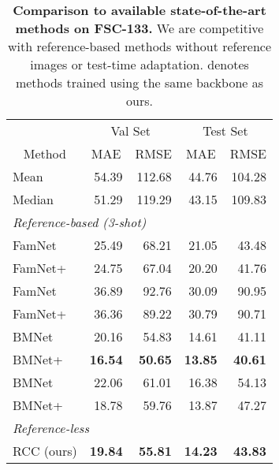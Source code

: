 \documentclass[letterpaper, 11pt]{IEEEtran}
\begin{document}
\begin{table}
    \centering
    \fontsize{9}{9}\selectfont
    \begin{tabular}{lrrrr}
 \toprule

 & \multicolumn{2}{c}{Val Set} & \multicolumn{2}{c}{Test Set} \\
\multicolumn{1}{c}{Method} & \multicolumn{1}{c}{MAE} & \multicolumn{1}{c}{RMSE} & \multicolumn{1}{c}{MAE} & \multicolumn{1}{c}{RMSE} \\
\midrule
Mean & 54.39 & 112.68 & 44.76 & 104.28 \\
Median & 51.29 & 119.29 & 43.15 & 109.83 \\
    \midrule

\multicolumn{3}{l}{\textit{Reference-based (3-shot)}} \\
FamNet 
 \cite{ranjan2021Famnet}
& 25.49 & 68.21 & 21.05 & 43.48 \\
FamNet+ 
 \cite{ranjan2021Famnet}
& 24.75 & 67.04
 &  20.20 & 41.76  \\ 
FamNet 
 \cite{ranjan2021Famnet}  &  
 36.89 & 92.76 & 30.09 & 90.95 \\ 
FamNet+ 
 \cite{ranjan2021Famnet}
 & 36.36 & 89.22 &  30.79 & 90.71\\ 
BMNet 
 \cite{shi2022represent} & 20.16 & 54.83  & 14.61  & 41.11 \\
BMNet+ 
 \cite{shi2022represent}
&\textbf{16.54} &  \textbf{50.65}  & \textbf{13.85}  & \textbf{40.61}  \\
BMNet 
 \cite{shi2022represent}
& 22.06 & 61.01 & 16.38 & 54.13\\ 
BMNet+  
 \cite{shi2022represent}
& 18.78 & 59.76  & 13.87  & 47.27  \\
\midrule
\multicolumn{3}{l}{\textit{Reference-less}} \\
RCC (ours) & \textbf{19.84}  & \textbf{55.81} & \textbf{14.23}  & \textbf{43.83} \\
\bottomrule
\end{tabular}
     \caption{\textbf{Comparison to available state-of-the-art methods on FSC-133.}  We are competitive with reference-based methods without  reference images or test-time adaptation.
     denotes methods trained using the same backbone as ours.
    }
    \label{FSC133_results_table}
\end{table}
\end{document}
